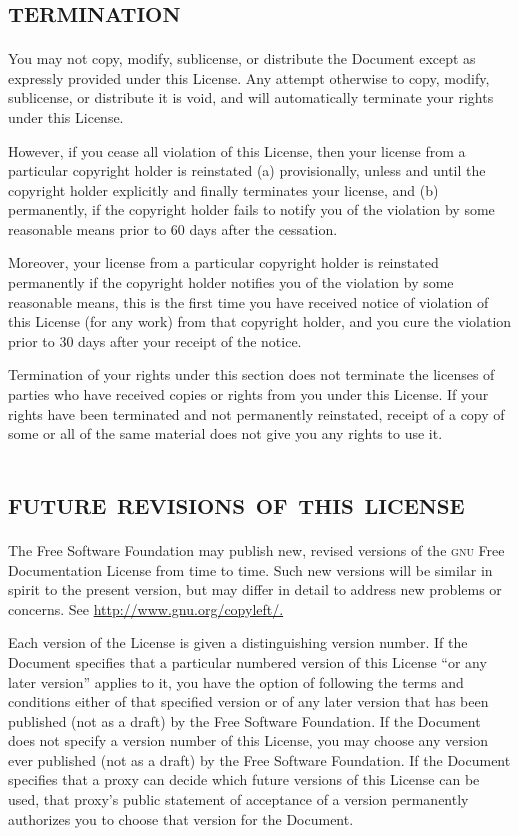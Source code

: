 \section[Termination]{\scshape termination}

You may not copy, modify, sublicense, or distribute the Document except as
expressly provided under this License. Any attempt otherwise to copy,
modify, sublicense, or distribute it is void, and will automatically
terminate your rights under this License.

However, if you cease all violation of this License, then your license from
a particular copyright holder is reinstated (a) provisionally, unless and
until the copyright holder explicitly and finally terminates your license,
and (b) permanently, if the copyright holder fails to notify you of the
violation by some reasonable means prior to 60 days after the cessation.

Moreover, your license from a particular copyright holder is reinstated
permanently if the copyright holder notifies you of the violation by some
reasonable means, this is the first time you have received notice of
violation of this License (for any work) from that copyright holder, and
you cure the violation prior to 30 days after your receipt of the notice.

Termination of your rights under this section does not terminate the
licenses of parties who have received copies or rights from you under this
License. If your rights have been terminated and not permanently
reinstated, receipt of a copy of some or all of the same material does not
give you any rights to use it.


\section[Future revisions of this license]{\scshape future revisions of
this license}

The Free Software Foundation may publish new, revised versions of the
\textsc{gnu} Free Documentation License from time to time. Such new
versions will be similar in spirit to the present version, but may differ
in detail to address new problems or concerns. See
\url{http://www.gnu.org/copyleft/.}

Each version of the License is given a distinguishing version number. If
the Document specifies that a particular numbered version of this License
``or any later version'' applies to it, you have the option of following
the terms and conditions either of that specified version or of any later
version that has been published (not as a draft) by the Free Software
Foundation. If the Document does not specify a version number of this
License, you may choose any version ever published (not as a draft) by the
Free Software Foundation. If the Document specifies that a proxy can decide
which future versions of this License can be used, that proxy's public
statement of acceptance of a version permanently authorizes you to choose
that version for the Document.


